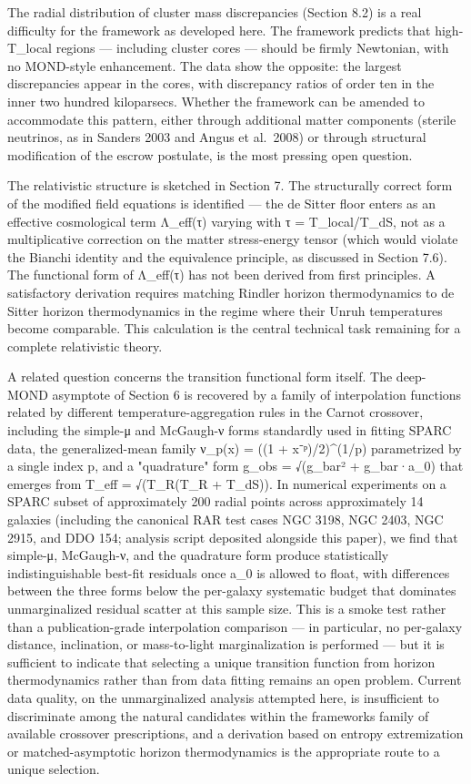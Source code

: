 \documentclass[11pt]{article}
\begin{document}
The radial distribution of cluster mass discrepancies (Section 8.2) is a real difficulty for the framework as developed here. The framework predicts that high-T\_local regions --- including cluster cores --- should be firmly Newtonian, with no MOND-style enhancement. The data show the opposite: the largest discrepancies appear in the cores, with discrepancy ratios of order ten in the inner two hundred kiloparsecs. Whether the framework can be amended to accommodate this pattern, either through additional matter components (sterile neutrinos, as in Sanders 2003 and Angus et al.~2008) or through structural modification of the escrow postulate, is the most pressing open question.

The relativistic structure is sketched in Section 7. The structurally correct form of the modified field equations is identified --- the de Sitter floor enters as an effective cosmological term Λ\_eff(τ) varying with τ = T\_local/T\_dS, not as a multiplicative correction on the matter stress-energy tensor (which would violate the Bianchi identity and the equivalence principle, as discussed in Section 7.6). The functional form of Λ\_eff(τ) has not been derived from first principles. A satisfactory derivation requires matching Rindler horizon thermodynamics to de Sitter horizon thermodynamics in the regime where their Unruh temperatures become comparable. This calculation is the central technical task remaining for a complete relativistic theory.

A related question concerns the transition functional form itself. The deep-MOND asymptote of Section 6 is recovered by a family of interpolation functions related by different temperature-aggregation rules in the Carnot crossover, including the simple-μ and McGaugh-ν forms standardly used in fitting SPARC data, the generalized-mean family ν\_p(x) = ((1 + x⁻ᵖ)/2)\^{}(1/p) parametrized by a single index p, and a "quadrature" form g\_obs = √(g\_bar² + g\_bar·a\_0) that emerges from T\_eff = √(T\_R(T\_R + T\_dS)). In numerical experiments on a SPARC subset of approximately 200 radial points across approximately 14 galaxies (including the canonical RAR test cases NGC 3198, NGC 2403, NGC 2915, and DDO 154; analysis script deposited alongside this paper), we find that simple-μ, McGaugh-ν, and the quadrature form produce statistically indistinguishable best-fit residuals once a\_0 is allowed to float, with differences between the three forms below the per-galaxy systematic budget that dominates unmarginalized residual scatter at this sample size. This is a smoke test rather than a publication-grade interpolation comparison --- in particular, no per-galaxy distance, inclination, or mass-to-light marginalization is performed --- but it is sufficient to indicate that selecting a unique transition function from horizon thermodynamics rather than from data fitting remains an open problem. Current data quality, on the unmarginalized analysis attempted here, is insufficient to discriminate among the natural candidates within the framework\textquotesingle s family of available crossover prescriptions, and a derivation based on entropy extremization or matched-asymptotic horizon thermodynamics is the appropriate route to a unique selection.
\end{document}
